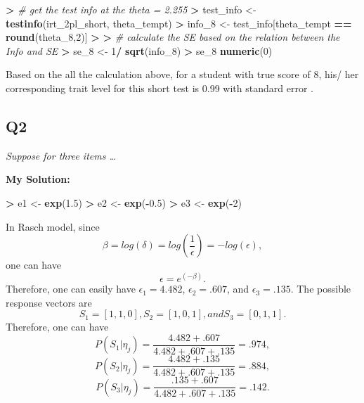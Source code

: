 \documentclass[
]{article}
\newenvironment{Shaded}{\begin{snugshade}}{\end{snugshade}}
\newcommand{\CommentTok}[1]{\textcolor[rgb]{0.56,0.35,0.01}{\textit{#1}}}
\newcommand{\DecValTok}[1]{\textcolor[rgb]{0.00,0.00,0.81}{#1}}
\newcommand{\ErrorTok}[1]{\textcolor[rgb]{0.64,0.00,0.00}{\textbf{#1}}}
\newcommand{\FloatTok}[1]{\textcolor[rgb]{0.00,0.00,0.81}{#1}}
\newcommand{\FunctionTok}[1]{\textcolor[rgb]{0.13,0.29,0.53}{\textbf{#1}}}
\newcommand{\NormalTok}[1]{#1}
\newcommand{\OtherTok}[1]{\textcolor[rgb]{0.56,0.35,0.01}{#1}}
\newcommand{\SpecialCharTok}[1]{\textcolor[rgb]{0.81,0.36,0.00}{\textbf{#1}}}
\begin{document}
\begin{Shaded}
\begin{Highlighting}[]
\SpecialCharTok{\textgreater{}} \CommentTok{\# get the test info at the theta = 2.255}
\ErrorTok{\textgreater{}}\NormalTok{ test\_info }\OtherTok{\textless{}{-}} \FunctionTok{testinfo}\NormalTok{(irt\_2pl\_short, theta\_tempt)}
\SpecialCharTok{\textgreater{}}\NormalTok{ info\_8 }\OtherTok{\textless{}{-}}\NormalTok{ test\_info[theta\_tempt }\SpecialCharTok{==} \FunctionTok{round}\NormalTok{(theta\_8,}\DecValTok{2}\NormalTok{)]}
\SpecialCharTok{\textgreater{}} 
\ErrorTok{\textgreater{}} \CommentTok{\# calculate the SE based on the relation between the Info and SE}
\ErrorTok{\textgreater{}}\NormalTok{ se\_8 }\OtherTok{\textless{}{-}} \DecValTok{1}\SpecialCharTok{/} \FunctionTok{sqrt}\NormalTok{(info\_8)}
\SpecialCharTok{\textgreater{}}\NormalTok{ se\_8}
\FunctionTok{numeric}\NormalTok{(}\DecValTok{0}\NormalTok{)}
\end{Highlighting}
\end{Shaded}

Based on the all the calculation above, for a student with true score of
8, his/ her corresponding trait level for this short test is 0.99 with
standard error .

\hypertarget{q2}{%
\subsection{Q2}\label{q2}}

\emph{Suppose for three items \ldots{}}

\textbf{My Solution:}

\begin{Shaded}
\begin{Highlighting}[]
\SpecialCharTok{\textgreater{}}\NormalTok{ e1 }\OtherTok{\textless{}{-}} \FunctionTok{exp}\NormalTok{(}\FloatTok{1.5}\NormalTok{)}
\SpecialCharTok{\textgreater{}}\NormalTok{ e2 }\OtherTok{\textless{}{-}} \FunctionTok{exp}\NormalTok{(}\SpecialCharTok{{-}}\FloatTok{0.5}\NormalTok{)}
\SpecialCharTok{\textgreater{}}\NormalTok{ e3 }\OtherTok{\textless{}{-}} \FunctionTok{exp}\NormalTok{(}\SpecialCharTok{{-}}\DecValTok{2}\NormalTok{)}
\end{Highlighting}
\end{Shaded}

In Rasch model, since
\[\beta = log(\delta) =log(\frac{1}{\epsilon})=-log(\epsilon), \] one
can have \[\epsilon=e^{(-\beta)}.\] Therefore, one can easily have
\(\epsilon_1 = 4.482\), \(\epsilon_2 = .607\), and
\(\epsilon_3 = .135\). The possible response vectors are
\[S_1=[1,1,0], S_2=[1,0,1], and S_3=[0,1,1].\] Therefore, one can have
\[P(S_1|\eta_j)=\frac{4.482+.607}{4.482+.607+.135}=.974,\]
\[P(S_2|\eta_j)=\frac{4.482+.135}{4.482+.607+.135}=.884,\] \[
P(S_3|\eta_j)=\frac{.135+.607}{4.482+.607+.135}=.142.\]
\end{document}
